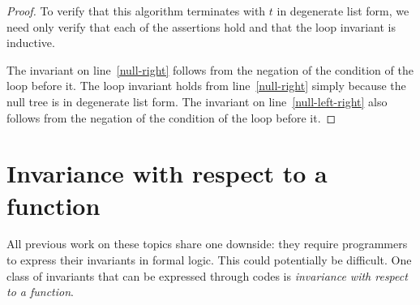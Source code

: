 \documentclass{llncs}
\begin{document}
\begin{proof}
  To verify that this algorithm terminates with $t$ in degenerate list form,
  we need only verify that each of the assertions hold and that the loop
  invariant is inductive.

  The invariant on line~\ref{null-right} follows from the negation of the
  condition of the loop before it.
  The loop invariant holds from line~\ref{null-right} simply because the null
  tree is in degenerate list form.
  The invariant on line~\ref{null-left-right} also follows from the negation of
  the condition of the loop before it.




\end{proof}

\section{Invariance with respect to a function}

All previous work on these topics share one downside: they require programmers
to express their invariants in formal logic. This could potentially be
difficult. One class of invariants that can be expressed through codes is
\emph{invariance with respect to a function}.
\end{document}
